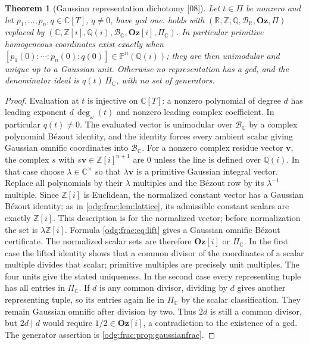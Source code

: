 \documentclass[11pt,oneside]{article}
\numberwithin{equation}{section}
\newtheorem{theorem}{Theorem}[section]
\theoremstyle{definition}
\theoremstyle{remark}
\newcommand{\Oz}{\mathbf{Oz}}
\newcommand{\Z}{\mathbb Z}
\newcommand{\Q}{\mathbb Q}
\newcommand{\R}{\mathbb R}
\newcommand{\C}{\mathbb C}
\newcommand{\BR}{\mathcal B_{\R}}
\newcommand{\BC}{\mathcal B_{\C}}
\newcommand{\ddeg}{\operatorname{deg}_{\omega}}
\newcommand{\src}[1]{\textup{\textsf{\small[#1]}}}
\newcommand{\Og}{\Oz[i]}
\begin{document}
\begin{theorem}[Gaussian representation dichotomy \src{08}]\label{odg:frac:thm:gaussian}
Let $t\in\Pi$ be nonzero and let $p_1,\ldots,p_n,q\in\C[T]$, $q\ne0$, have gcd
one.  holds with $(\R,\Z,\Q,\BR,\Oz,\Pi)$ replaced by
$(\C,\Z[i],\Q(i),\BC,\Og,\Pi_{\C})$. In particular primitive homogeneous
coordinates exist exactly when $[p_1(0):\cdots:p_n(0):q(0)]\in\mathbb P^n(\Q(i))$;
they are then unimodular and unique up to a Gaussian unit. Otherwise no
representation has a gcd, and the denominator ideal is $q(t)\,\Pi_{\C}$, with no
set of generators.
\end{theorem}
\begin{proof}
Evaluation at $t$ is injective on $\C[T]$: a nonzero polynomial of degree
$d$ has leading exponent $d\,\ddeg(t)$ and nonzero leading complex
coefficient. In particular $q(t)\ne0$. The evaluated vector is unimodular
over $\BC$ by a complex polynomial B\'ezout identity, and the identity
forces every ambient scalar giving Gaussian omnific coordinates into
$\BC$. For a nonzero complex residue vector $\mathbf v$, the
complex $s$ with $s\mathbf v\in\Z[i]^{n+1}$ are $0$ unless the line is defined over
$\Q(i)$. In that case choose $\lambda\in\C^\times$ so that
$\lambda\mathbf v$ is a primitive Gaussian integral vector. Replace all
polynomials by their $\lambda$ multiples and the B\'ezout row by its
$\lambda^{-1}$ multiple. Since $\Z[i]$ is Euclidean, the normalized
constant vector has a Gaussian B\'ezout identity; as in
\cref{odg:frac:lem:lattice}, its admissible constant scalars are exactly
$\Z[i]$. This description is for the normalized vector; before
normalization the set is $\lambda\Z[i]$.
Formula \eqref{odg:frac:eq:lift} gives a Gaussian omnific B\'ezout certificate.
The normalized scalar sets are therefore $\Og$ or $\Pi_{\C}$. In the
first case the lifted identity shows that a common divisor of the
coordinates of a scalar multiple divides that scalar; primitive multiples
are precisely unit multiples. The four units give the stated uniqueness.
In the second case every representing tuple has all entries in $\Pi_{\C}$.
If $d$ is any common divisor, dividing by $d$ gives another representing
tuple, so its entries again lie in $\Pi_{\C}$ by the scalar
classification. They remain Gaussian omnific after division by two.
Thus $2d$ is still a common divisor, but $2d\mid d$ would require
$1/2\in\Og$, a contradiction to the existence of a gcd.
The generator assertion is \cref{odg:frac:prop:gaussianfrac}.
\end{proof}
\end{document}
